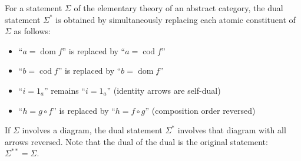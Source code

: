 For a statement $\Sigma$ of the elementary theory of an abstract category, the dual statement $\Sigma^{*}$ is obtained by simultaneously replacing each atomic constituent of $\Sigma$ as follows:

\begin{itemize}
\item ``$a = \operatorname{dom} f$'' is replaced by ``$a = \operatorname{cod} f$''
\item ``$b = \operatorname{cod} f$'' is replaced by ``$b = \operatorname{dom} f$''
\item ``$i = 1_a$'' remains ``$i = 1_a$'' (identity arrows are self-dual)
\item ``$h = g \circ f$'' is replaced by ``$h = f \circ g$'' (composition order reversed)
\end{itemize}

If $\Sigma$ involves a diagram, the dual statement $\Sigma^{*}$ involves that diagram with all arrows reversed. Note that the dual of the dual is the original statement: $\Sigma^{**} = \Sigma$.
